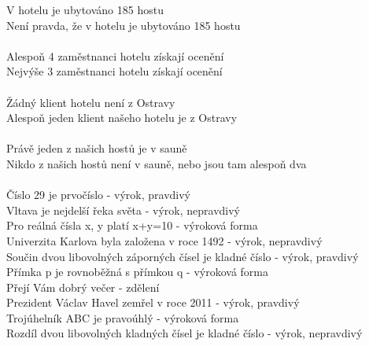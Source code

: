 \documentclass[a4paper,12pt]{article}
\begin{document}
V hotelu je ubytováno 185 hostu \\
Není pravda, že v hotelu je ubytováno 185 hostu \\ \\
Alespoň 4 zaměstnanci hotelu získají ocenění \\
Nejvýše 3 zaměstnanci hotelu získají ocenění \\ \\
Žádný klient hotelu není z Ostravy \\
Alespoň jeden klient našeho hotelu je z Ostravy \\ \\
Právě jeden z našich hostů je v sauně \\
Nikdo z našich hostů není v sauně, nebo jsou tam alespoň dva \\ \\
Číslo 29 je prvočíslo - výrok, pravdivý \\
Vltava je nejdelší řeka světa - výrok, nepravdivý \\
Pro reálná čísla x, y platí x+y=10 - výroková forma \\
Univerzita Karlova byla založena v roce 1492 - výrok, nepravdivý \\
Součin dvou libovolných záporných čísel je kladné číslo - výrok, pravdivý \\
Přímka p je rovnoběžná s přímkou q - výroková forma \\
Přejí Vám dobrý večer - zdělení \\
Prezident Václav Havel zemřel v roce 2011 - výrok, pravdivý \\
Trojúhelník ABC je pravoúhlý - výroková forma \\
Rozdíl dvou libovolných kladných čísel je kladné číslo - výrok, nepravdivý \\
\end{document}

